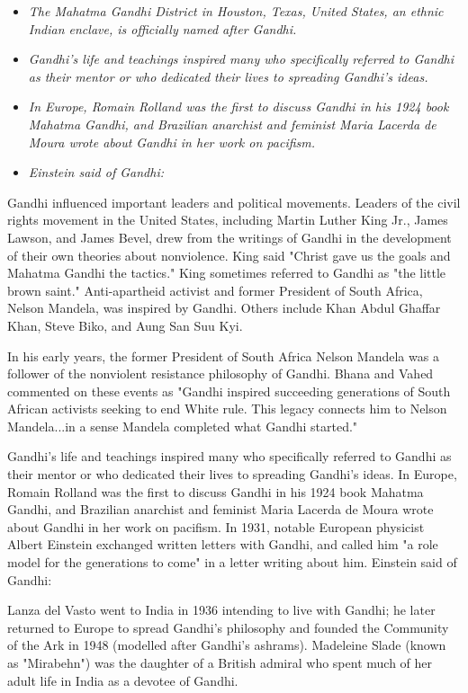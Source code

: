 \begin{itemize}
\item
  \emph{The Mahatma Gandhi District in Houston, Texas, United States, an
  ethnic Indian enclave, is officially named after Gandhi.}
\item
  \emph{Gandhi's life and teachings inspired many who specifically
  referred to Gandhi as their mentor or who dedicated their lives to
  spreading Gandhi's ideas.}
\item
  \emph{In Europe, Romain Rolland was the first to discuss Gandhi in his
  1924 book Mahatma Gandhi, and Brazilian anarchist and feminist Maria
  Lacerda de Moura wrote about Gandhi in her work on pacifism.}
\item
  \emph{Einstein said of Gandhi:}
\end{itemize}

Gandhi influenced important leaders and political movements. Leaders of
the civil rights movement in the United States, including Martin Luther
King Jr., James Lawson, and James Bevel, drew from the writings of
Gandhi in the development of their own theories about nonviolence. King
said "Christ gave us the goals and Mahatma Gandhi the tactics." King
sometimes referred to Gandhi as "the little brown saint." Anti-apartheid
activist and former President of South Africa, Nelson Mandela, was
inspired by Gandhi. Others include Khan Abdul Ghaffar Khan, Steve Biko,
and Aung San Suu Kyi.

In his early years, the former President of South Africa Nelson Mandela
was a follower of the nonviolent resistance philosophy of Gandhi. Bhana
and Vahed commented on these events as "Gandhi inspired succeeding
generations of South African activists seeking to end White rule. This
legacy connects him to Nelson Mandela...in a sense Mandela completed
what Gandhi started."

Gandhi's life and teachings inspired many who specifically referred to
Gandhi as their mentor or who dedicated their lives to spreading
Gandhi's ideas. In Europe, Romain Rolland was the first to discuss
Gandhi in his 1924 book Mahatma Gandhi, and Brazilian anarchist and
feminist Maria Lacerda de Moura wrote about Gandhi in her work on
pacifism. In 1931, notable European physicist Albert Einstein exchanged
written letters with Gandhi, and called him "a role model for the
generations to come" in a letter writing about him. Einstein said of
Gandhi:

Lanza del Vasto went to India in 1936 intending to live with Gandhi; he
later returned to Europe to spread Gandhi's philosophy and founded the
Community of the Ark in 1948 (modelled after Gandhi's ashrams).
Madeleine Slade (known as "Mirabehn") was the daughter of a British
admiral who spent much of her adult life in India as a devotee of
Gandhi.

